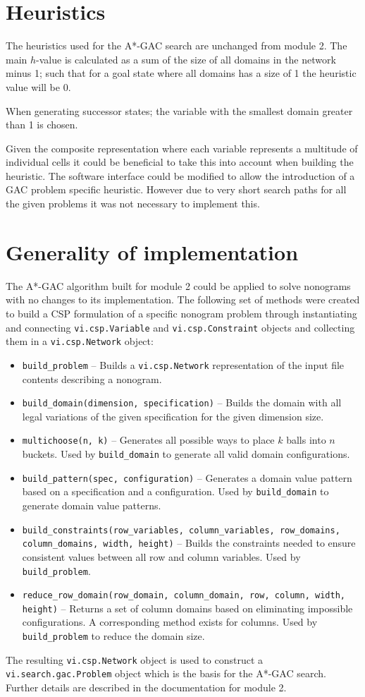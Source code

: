 \section*{Heuristics}

The heuristics used for the A*-GAC search are unchanged from module 2. The main $h$-value is calculated as a sum of the size of all domains in the network minus 1; such that for a goal state where all domains has a size of 1 the heuristic value will be 0.

When generating successor states; the variable with the smallest domain greater than 1 is chosen.

Given the composite representation where each variable represents a multitude of individual cells it could be beneficial to take this into account when building the heuristic. The software interface could be modified to allow the introduction of a \ac{GAC} problem specific heuristic. However due to very short search paths for all the given problems it was not necessary to implement this.

\section*{Generality of implementation}

The A*-GAC algorithm built for module 2 could be applied to solve nonograms with no changes to its implementation. The following set of methods were created to build a \ac{CSP} formulation of a specific nonogram problem through instantiating and connecting \texttt{vi.csp.Variable} and \texttt{vi.csp.Constraint} objects and collecting them in a \texttt{vi.csp.Network} object:

\begin{itemize}
\item \texttt{build\_problem} -- Builds a \texttt{vi.csp.Network} representation of the input file contents describing a nonogram.
\item \texttt{build\_domain(dimension, specification)} -- Builds the domain with all legal variations of the given specification for the given dimension size.
\item \texttt{multichoose(n, k)} -- Generates all possible ways to place $k$ balls into $n$ buckets. Used by \texttt{build\_domain} to generate all valid domain configurations.
\item \texttt{build\_pattern(spec, configuration)} -- Generates a domain value pattern based on a specification and a configuration. Used by \texttt{build\_domain} to generate domain value patterns.
\item \texttt{build\_constraints(row\_variables, column\_variables, row\_domains, column\_domains, width, height)} -- Builds the constraints needed to ensure consistent values between all row and column variables. Used by \texttt{build\_problem}.
\item \texttt{reduce\_row\_domain(row\_domain, column\_domain, row, column, width, height)} -- Returns a set of column domains based on eliminating impossible configurations. A corresponding method exists for columns. Used by \texttt{build\_problem} to reduce the domain size.
\end{itemize}

The resulting \texttt{vi.csp.Network} object is used to construct a \texttt{vi.search.gac.Problem} object which is the basis for the A*-GAC search. Further details are described in the documentation for module 2.



